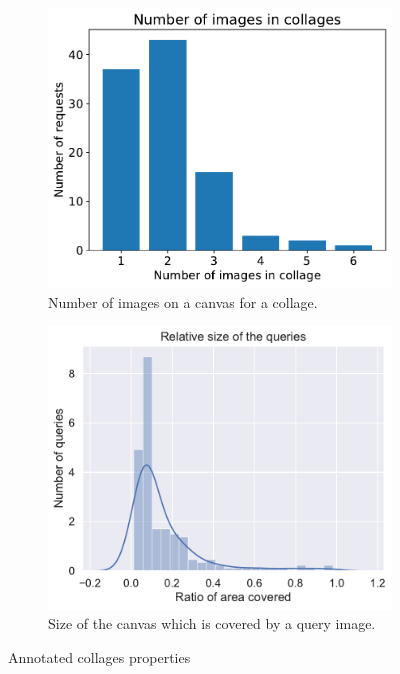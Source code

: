 \begin{figure}
     \centering
     \begin{subfigure}[b]{0.48\textwidth}
         \centering
         \includegraphics[width=\textwidth]{graphs/num_queries_in_request.pdf}
         \caption{Number of images on a canvas for a collage.}
         \label{fig:y equals x}
     \end{subfigure}
     \hfill
     \begin{subfigure}[b]{0.48\textwidth}
         \centering
         \includegraphics[width=\textwidth]{graphs/queries_size.pdf}
         \caption{Size of the canvas which is covered by a query image.}
         \label{fig:three sin x}
     \end{subfigure}
    
    \caption{Annotated collages properties}
    \label{fig:annotated_dataset}
\end{figure}


